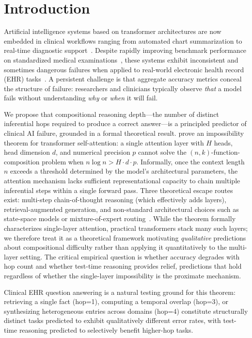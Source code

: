 \documentclass{article}
\begin{document}
\section{Introduction}

Artificial intelligence systems based on transformer architectures are now
embedded in clinical workflows ranging from automated chart summarization to
real-time diagnostic support~\citep{singhal2023large,mcduff2025}.
Despite rapidly improving benchmark performance on standardized medical
examinations~\citep{jin2020disease,hendrycks2021measuring}, these systems
exhibit inconsistent and sometimes dangerous failures when applied to
real-world electronic health record (EHR) tasks~\citep{noharm2025}.
A persistent challenge is that aggregate accuracy metrics conceal the
structure of failure: researchers and clinicians typically observe \emph{that}
a model fails without understanding \emph{why} or \emph{when} it will fail.

We propose that compositional reasoning depth---the number of distinct
inferential hops required to produce a correct answer---is a principled
predictor of clinical AI failure, grounded in a formal theoretical result.
\citet{peng2024limitations} prove an impossibility theorem for transformer
self-attention: a single attention layer with $H$ heads, head dimension $d$,
and numerical precision $p$ cannot solve the $(n, k)$-function-composition
problem when $n \log n > H \cdot d \cdot p$. Informally, once the context
length $n$ exceeds a threshold determined by the model's architectural
parameters, the attention mechanism lacks sufficient representational capacity
to chain multiple inferential steps within a single forward pass.
Three theoretical escape routes exist: multi-step chain-of-thought reasoning
(which effectively adds layers), retrieval-augmented generation, and
non-standard architectural choices such as state-space models or mixture-of-expert routing~\citep{zhou2023brainformers,yehudai2025compositional}.
While the theorem formally characterizes single-layer attention, practical transformers
stack many such layers; we therefore treat it as a theoretical framework motivating
\emph{qualitative} predictions about compositional difficulty rather than applying it
quantitatively to the multi-layer setting. The critical empirical question is whether
accuracy degrades with hop count and whether test-time reasoning provides relief, predictions
that hold regardless of whether the single-layer impossibility is the proximate mechanism.

Clinical EHR question answering is a natural testing ground for this theorem: retrieving a single fact (hop=1), computing a temporal overlap (hop=3), or synthesizing heterogeneous entries across domains (hop=4) constitute structurally distinct tasks predicted to exhibit qualitatively different error rates, with test-time reasoning predicted to selectively benefit higher-hop tasks.
\end{document}

